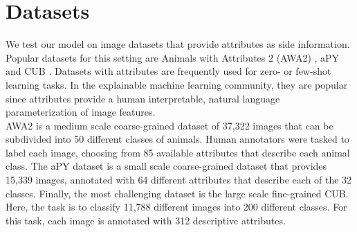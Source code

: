 \documentclass[a4paper,cleardoubleempty,BCOR1cm, 11pt]{report}
\begin{document}
\section{Datasets}
We test our model on image datasets that provide attributes as side information. Popular datasets for this setting are Animals with Attributes 2 (AWA2) \cite{8413121}, aPY \cite{farhadi2009describing} and CUB \cite{WahCUB_200_2011}. Datasets with attributes are frequently used for zero- or few-shot learning tasks. In the explainable machine learning community, they are popular since attributes provide a human interpretable, natural language parameterization of image features.\\
AWA2 is a medium scale coarse-grained dataset of 37,322 images that can be subdivided into 50 different classes of animals. Human annotators were tasked to label each image, choosing from 85 available attributes that describe each animal class. The aPY dataset is a small scale coarse-grained dataset that provides 15,339 images, annotated with 64 different attributes that describe each of the 32 classes. Finally, the most challenging dataset is the large scale fine-grained CUB. Here, the task is to classify 11,788 different images into 200 different classes. For this task, each image is annotated with 312 descriptive attributes.
\end{document}
